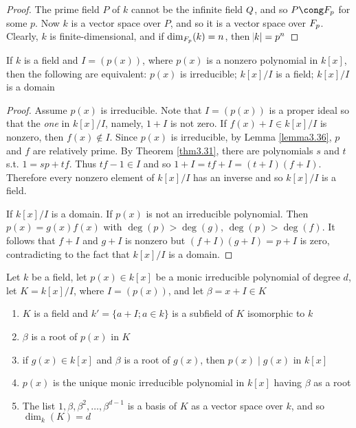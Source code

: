 \documentclass[11pt]{article}
\begin{document}
\begin{proof}
The prime field \(P\) of \(k\) cannot be the infinite field \(\relax{Q}\), and so
\(P\cong\F_p\) for some \(p\). Now \(k\) is a  vector space over \(P\), and so it is
a vector space over \(\relax{F}_p\). Clearly, \(k\) is finite-dimensional, and if
\(\dim_{\relax{F}_p}(k)=n\), then \(\abs{k}=p^n\)
\end{proof}

\begin{proposition}[]
\label{prop3.116}
If \(k\) is a field and \(I=(p(x))\), where \(p(x)\) is a nonzero polynomial in
\(k[x]\), then the following are equivalent: \(p(x)\) is irreducible;
\(k[x]/I\) is a field; \(k[x]/I\) is a domain
\end{proposition}

\begin{proof}
Assume \(p(x)\) is irreducible. Note that \(I=(p(x))\) is a proper ideal so
that the \emph{one} in \(k[x]/I\), namely, \(1+I\) is not zero. If 
\(f(x)+I\in k[x]/I\) is nonzero, then \(f(x)\not\in I\). Since \(p(x)\) is
irreducible, by Lemma \ref{lemma3.36}, \(p\) and \(f\) are relatively prime. By 
Theorem \ref{thm3.31}, there are polynomials \(s\) and \(t\) s.t. \(1=sp+tf\).
Thus \(tf-1\in I\) and so \(1+I=tf+I=(t+I)(f+I)\). Therefore every nonzero
element of \(k[x]/I\) has an inverse and so \(k[x]/I\) is a field.

If \(k[x]/I\) is a domain. If \(p(x)\) is not an irreducible polynomial. Then 
\(p(x)=g(x)f(x)\) with \(\deg(p)> \deg(g)\), \(\deg(p)>\deg(f)\). It follows
that \(f+I\) and \(g+I\) is nonzero but \((f+I)(g+I)=p+I\) is zero,
contradicting to the fact that \(k[x]/I\) is a domain.
\end{proof}

\begin{proposition}[]
\label{prop3.117}
Let \(k\) be a field, let \(p(x)\in k[x]\) be a monic irreducible polynomial of
degree \(d\), let \(K=k[x]/I\), where \(I=(p(x))\), and let \(\beta=x+I\in K\)
\begin{enumerate}
\item \(K\) is a field and \(k'=\{a+I;a\in k\}\) is a subfield of \(K\) isomorphic
to \(k\)
\item \(\beta\) is a root of \(p(x)\) in \(K\)
\item if \(g(x)\in k[x]\) and \(\beta\) is a root of \(g(x)\), then \(p(x)\mid g(x)\) in 
\(k[x]\)
\item \(p(x)\) is the unique monic irreducible polynomial in \(k[x]\) having \(\beta\) as
a root
\item The list \(1,\beta,\beta^2,\dots,\beta^{d-1}\) is a basis of \(K\) as a vector space
over \(k\), and so \(\dim_k(K)=d\)
\end{enumerate}
\end{proposition}
\end{document}
